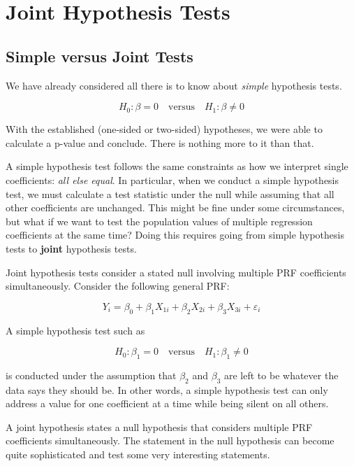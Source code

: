 \documentclass[
]{book}
\begin{document}
\hypertarget{joint-hypothesis-tests}{%
\section{Joint Hypothesis Tests}\label{joint-hypothesis-tests}}

\hypertarget{simple-versus-joint-tests}{%
\subsection{Simple versus Joint Tests}\label{simple-versus-joint-tests}}

We have already considered all there is to know about \emph{simple} hypothesis tests.

\[H_0: \beta = 0 \quad \text{versus} \quad H_1: \beta \neq 0\]

With the established (one-sided or two-sided) hypotheses, we were able to calculate a p-value and conclude. There is nothing more to it than that.

A simple hypothesis test follows the same constraints as how we interpret single coefficients: \emph{all else equal}. In particular, when we conduct a simple hypothesis test, we must calculate a test statistic under the null while assuming that all other coefficients are unchanged. This might be fine under some circumstances, but what if we want to test the population values of multiple regression coefficients at the same time? Doing this requires going from simple hypothesis tests to \textbf{joint} hypothesis tests.

Joint hypothesis tests consider a stated null involving multiple PRF coefficients simultaneously. Consider the following general PRF:

\[Y_i = \beta_0 + \beta_1 X_{1i} + \beta_2 X_{2i} + \beta_3 X_{3i} + \varepsilon_i\]

A simple hypothesis test such as

\[H_0: \beta_1 = 0 \quad \text{versus} \quad H_1: \beta_1 \neq 0\]

is conducted under the assumption that \(\beta_2\) and \(\beta_3\) are left to be whatever the data says they should be. In other words, a simple hypothesis test can only address a value for one coefficient at a time while being silent on all others.

A joint hypothesis states a null hypothesis that considers multiple PRF coefficients simultaneously. The statement in the null hypothesis can become quite sophisticated and test some very interesting statements.
\end{document}
